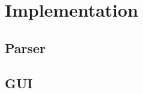

\chapter{Implementation}\label{cha:Implementation}
\section{Parser}\label{sec:ImplementationParser}

\section{GUI}\label{sec:GUI}
